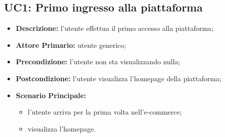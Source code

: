 \subsection{UC1: Primo ingresso alla piattaforma}
\label{sec:UC1}
\begin{itemize}
    \item \textbf{Descrizione:} l'utente effettua il primo accesso alla piattaforma;
    \item \textbf{Attore Primario:} utente generico;
    \item \textbf{Precondizione:} l'utente non sta visualizzando nulla;
    \item \textbf{Postcondizione:} l'utente visualizza l'homepage della piattaforma;
    \item \textbf{Scenario Principale:} 
    \begin{itemize}
        \item l'utente arriva per la prima volta nell'e-commerce;
        \item visualizza l'homepage.
    \end{itemize}
\end{itemize}
